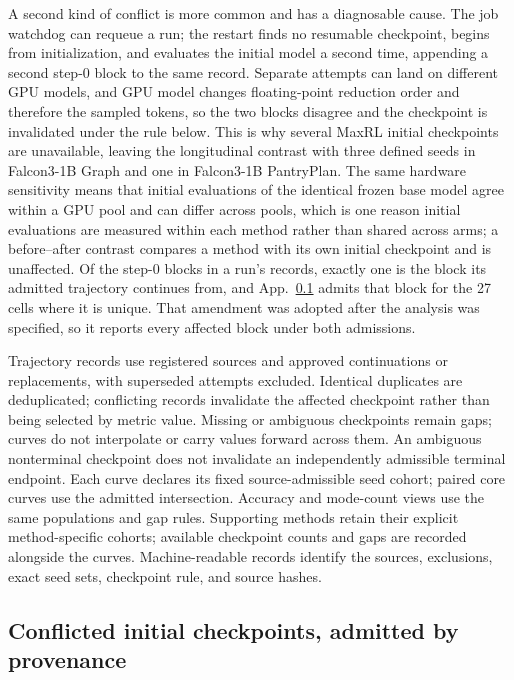 \documentclass{article}
\newcommand{\1}{\mathbf 1}
\theoremstyle{remark}
\theoremstyle{definition}
\theoremstyle{plain}
\begin{document}
A second kind of conflict is more common and has a diagnosable cause. The job
watchdog can requeue a run; the restart finds no resumable checkpoint, begins
from initialization, and evaluates the initial model a second time, appending a
second step-0 block to the same record. Separate attempts can land on different
GPU models, and GPU model changes floating-point reduction order and therefore
the sampled tokens, so the two blocks disagree and the checkpoint is invalidated
under the rule below. This is why several MaxRL initial checkpoints are
unavailable, leaving the longitudinal contrast with three defined seeds in
Falcon3-1B Graph and one in Falcon3-1B PantryPlan. The same hardware
sensitivity means that initial evaluations of the identical frozen base model
agree within a GPU pool and can differ across pools, which is one reason
initial evaluations are measured within each method rather than shared across
arms; a before--after contrast compares a method with its own initial
checkpoint and is unaffected. Of the step-0 blocks in a run's records, exactly one is the block its admitted
trajectory continues from, and App.~\ref{app:initial-provenance} admits that
block for the 27 cells where it is unique. That amendment was adopted after the
analysis was specified, so it reports every affected block under both
admissions.

Trajectory records use registered sources and approved continuations or
replacements, with superseded attempts excluded. Identical duplicates are
deduplicated; conflicting records invalidate the affected checkpoint rather
than being selected by metric value. Missing or ambiguous checkpoints remain gaps;
curves do not interpolate or carry values forward across them. An ambiguous
nonterminal checkpoint does not invalidate an independently admissible
terminal endpoint. Each curve declares its fixed source-admissible seed cohort; paired core
curves use the admitted intersection. Accuracy and mode-count views use
the same populations and gap rules. Supporting methods retain their
explicit method-specific cohorts; available checkpoint counts and gaps
are recorded alongside the curves. Machine-readable records identify the
sources, exclusions, exact seed sets, checkpoint rule, and source hashes.

\subsection{Conflicted initial checkpoints, admitted by provenance}
\label{app:initial-provenance}
\end{document}
